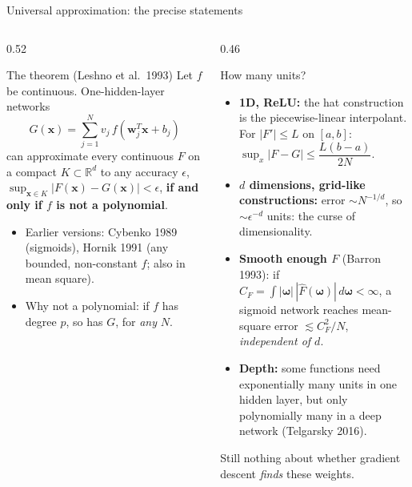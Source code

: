 \documentclass[10pt,aspectratio=169]{beamer}
\begin{document}
\begin{frame}{Universal approximation: the precise statements}
\begin{columns}[T]
\begin{column}{0.52\textwidth}
\begin{block}{The theorem (Leshno et al.\ 1993)}
\small
Let $f$ be continuous.  One-hidden-layer networks
\[
  G(\bm{x})=\sum_{j=1}^{N}v_j\,f(\bm{w}_j^{T}\bm{x}+b_j)
\]
can approximate every continuous $F$ on a compact $K\subset\mathbb{R}^{d}$
to any accuracy $\epsilon$,
$\sup_{\bm{x}\in K}|F(\bm{x})-G(\bm{x})|<\epsilon$,
\textbf{if and only if $f$ is not a polynomial}.
\end{block}
\footnotesize
\begin{itemize}
  \item Earlier versions: Cybenko 1989 (sigmoids), Hornik 1991 (any
        bounded, non-constant $f$; also in mean square).
  \item Why not a polynomial: if $f$ has degree $p$, so has $G$, for
        \emph{any} $N$.
\end{itemize}
\end{column}
\begin{column}{0.46\textwidth}
\begin{block}{How many units?}
\footnotesize
\begin{itemize}
  \item \textbf{1D, ReLU:} the hat construction is the piecewise-linear
        interpolant.  For $|F'|\le L$ on $[a,b]$:
        $\sup_x|F-G|\le\dfrac{L(b-a)}{2N}$.
  \item \textbf{$d$ dimensions, grid-like constructions:} error
        $\sim N^{-1/d}$, so $\sim\epsilon^{-d}$ units: the curse of
        dimensionality.
  \item \textbf{Smooth enough $F$} (Barron 1993): if
        $C_F=\int|\bm{\omega}|\,|\hat F(\bm{\omega})|\,d\bm{\omega}<\infty$,
        a sigmoid network reaches mean-square error
        $\lesssim C_F^{2}/N$, \emph{independent of $d$}.
  \item \textbf{Depth:} some functions need exponentially many units in
        one hidden layer, but only polynomially many in a deep network
        (Telgarsky 2016).
\end{itemize}
\end{block}
\footnotesize Still nothing about whether gradient descent \emph{finds}
these weights.
\end{column}
\end{columns}
\end{frame}
\end{document}
